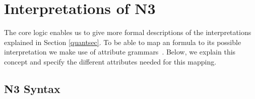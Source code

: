 
\section{Interpretations of N3}\label{n3}
The core logic enables us to give more formal descriptions of the \nthree interpretations explained in Section \ref{quantsec}.
To be able to map an \nthree formula to its possible interpretation we make use of attribute grammars~\cite{attributegrammar,ag2}. 
Below, we explain this concept and specify the different attributes needed for this mapping.



\subsection{N3 Syntax}\label{n3synsec}
